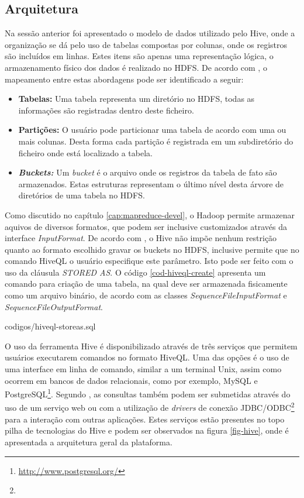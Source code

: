 \subsection{Arquitetura}

Na sessão anterior foi apresentado o modelo de dados utilizado pelo Hive, onde a organização se dá pelo uso de tabelas compostas por colunas, onde os registros são incluídos em linhas. Estes itens são apenas uma representação lógica, o armazenamento físico dos dados é realizado no HDFS. De acordo com , o mapeamento entre estas abordagens pode ser identificado a seguir:

\begin{itemize}

  \item \textbf{Tabelas:} Uma tabela representa um diretório no HDFS, todas as informações são registradas dentro deste ficheiro.
  \item \textbf{Partições:} O usuário pode particionar uma tabela de acordo com uma ou mais colunas. Desta forma cada partição é registrada em um subdiretório do ficheiro onde está localizado a tabela.
  \item \textit{\textbf{Buckets:}} Um \textit{bucket} é o arquivo onde os registros da tabela de fato são armazenados. Estas estruturas representam o último nível desta árvore de diretórios de uma tabela no HDFS.

\end{itemize}

Como discutido no capítulo \ref{cap:mapreduce-devel}, o Hadoop permite armazenar aquivos de diversos formatos, que podem ser inclusive customizados através da interface \textit{InputFormat}. De acordo com , o Hive não impõe nenhum restrição quanto ao formato escolhido gravar os buckets no HDFS, inclusive permite que no comando HiveQL o usuário especifique este parâmetro. Isto pode ser feito com o uso da cláusula \textit{STORED AS}. O código \ref{cod-hiveql-create} apresenta um comando para criação de uma tabela, na qual deve ser armazenada fisicamente como um arquivo binário, de acordo com as classes \textit{SequenceFileInputFormat} e \textit{SequenceFileOutputFormat}.



		{codigos/hiveql-storeas.sql}
\FloatBarrier

O uso da ferramenta Hive é disponibilizado através de três serviços que permitem usuários executarem comandos no formato HiveQL. Uma das opções é o uso de uma interface em linha de comando, similar a um terminal Unix, assim como ocorrem em bancos de dados relacionais, como por exemplo, MySQL e PostgreSQL\footnote{\url{http://www.postgresql.org/}}. Segundo , as consultas também podem ser submetidas através do uso de um serviço web ou com a utilização de \textit{drivers} de conexão JDBC/ODBC\footnote{} para a interação com outras aplicações. Estes serviços estão presentes no topo pilha de tecnologias do Hive e podem ser observados na figura \ref{fig-hive}, onde é apresentada a arquitetura geral da plataforma.

